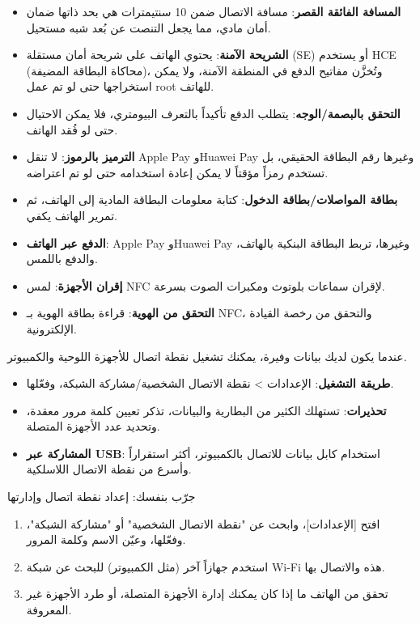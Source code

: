 
\begin{itemize}
  \item \textbf{المسافة الفائقة القصر}: مسافة الاتصال ضمن 10 سنتيمترات هي بحد ذاتها ضمان أمان مادي، مما يجعل التنصت عن بُعد شبه مستحيل.
  \item \textbf{الشريحة الآمنة}: يحتوي الهاتف على شريحة أمان مستقلة (SE) أو يستخدم HCE (محاكاة البطاقة المضيفة)، وتُخزَّن مفاتيح الدفع في المنطقة الآمنة، ولا يمكن استخراجها حتى لو تم عمل root للهاتف.
  \item \textbf{التحقق بالبصمة/الوجه}: يتطلب الدفع تأكيداً بالتعرف البيومتري، فلا يمكن الاحتيال حتى لو فُقد الهاتف.
  \item \textbf{الترميز بالرموز}: لا تنقل Apple Pay وHuawei Pay وغيرها رقم البطاقة الحقيقي، بل تستخدم رمزاً مؤقتاً لا يمكن إعادة استخدامه حتى لو تم اعتراضه.
\end{itemize}


\begin{itemize}
  \item \textbf{بطاقة المواصلات/بطاقة الدخول}: كتابة معلومات البطاقة المادية إلى الهاتف، ثم تمرير الهاتف يكفي.
  \item \textbf{الدفع عبر الهاتف}: Apple Pay وHuawei Pay وغيرها، تربط البطاقة البنكية بالهاتف، والدفع باللمس.
  \item \textbf{إقران الأجهزة}: لمس NFC لإقران سماعات بلوتوث ومكبرات الصوت بسرعة.
  \item \textbf{التحقق من الهوية}: قراءة بطاقة الهوية بـ NFC، والتحقق من رخصة القيادة الإلكترونية.
\end{itemize}


عندما يكون لديك بيانات وفيرة، يمكنك تشغيل نقطة اتصال للأجهزة اللوحية والكمبيوتر.

\begin{itemize}
  \item \textbf{طريقة التشغيل}: الإعدادات > نقطة الاتصال الشخصية/مشاركة الشبكة، وفعّلها.
  \item \textbf{تحذيرات}: تستهلك الكثير من البطارية والبيانات، تذكر تعيين كلمة مرور معقدة، وتحديد عدد الأجهزة المتصلة.
  \item \textbf{المشاركة عبر USB}: استخدام كابل بيانات للاتصال بالكمبيوتر، أكثر استقراراً وأسرع من نقطة الاتصال اللاسلكية.
\end{itemize}

\begin{tcbpractice}{جرّب بنفسك: إعداد نقطة اتصال وإدارتها}
\begin{enumerate}
  \item افتح [الإعدادات]، وابحث عن "نقطة الاتصال الشخصية" أو "مشاركة الشبكة"، وفعّلها، وعيّن الاسم وكلمة المرور.
  \item استخدم جهازاً آخر (مثل الكمبيوتر) للبحث عن شبكة Wi-Fi هذه والاتصال بها.
  \item تحقق من الهاتف ما إذا كان يمكنك إدارة الأجهزة المتصلة، أو طرد الأجهزة غير المعروفة.
\end{enumerate}

\end{tcbpractice}
